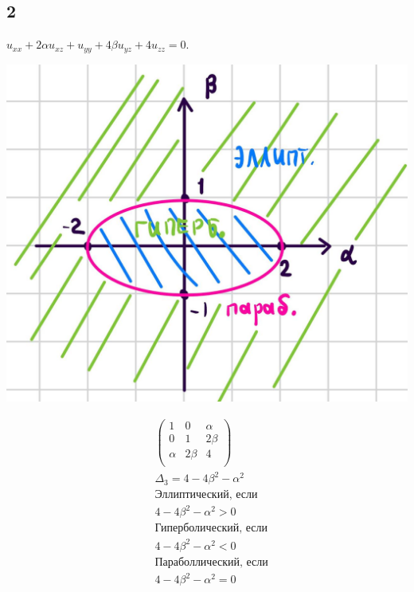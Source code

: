 \subsection{2} 
$u_{xx}+2\alpha u_{xz}+u_{yy}+4\beta u_{yz}+4u_{zz}=0.$ \\
  \begin{minipage}{0.3\textwidth}
  \includegraphics[width=1.4\linewidth]{pictures/u3.jpg} 
  \end{minipage}
  \begin{minipage}{0.6\textwidth}\raggedleft
\begin{align*}
&\begin{pmatrix}
  1 & 0&\alpha \\
  0&1&2\beta \\ 
  \alpha&2\beta&4 \\
\end{pmatrix} \\
&\Delta_{3}=4-4\beta^{2}-\alpha^{2}\\
&\text{Эллиптический, если} \\ 
&4-4\beta^{2}-\alpha^{2}>0\\
&\text{Гиперболический, если} \\ 
&4-4\beta^{2}-\alpha^{2}<0\\
&\text{Параболлический, если} \\ 
&4-4\beta^{2}-\alpha^{2}=0\\
\end{align*}
  \end{minipage}
